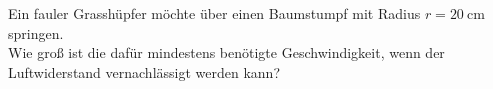 \begin{Exercise}[label = grassh, title = fauler Grasshüpfer, origin = P.Gnädig, difficulty = 5]
	Ein fauler Grasshüpfer möchte über einen Baumstumpf mit Radius $r = 20~\mathrm{cm}$ springen.\\
	Wie groß ist die dafür mindestens benötigte Geschwindigkeit, wenn der Luftwiderstand vernachlässigt werden kann?
\end{Exercise}